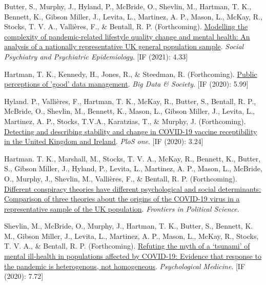 \documentclass[12pt]{article}
\begin{document}
\begin{bibenum}
\item Butter, S.,  Murphy, J., Hyland, P., McBride, O., Shevlin, M., Hartman, T. K., Bennett, K., Gibson Miller, J., Levita, L., Martinez, A. P., Mason, L., McKay, R., Stocks, T. V. A., Vallières, F., \& Bentall, R. P. (Forthcoming). \href{https://psyarxiv.com/2vw7d/}{Modelling the complexity of pandemic-related lifestyle quality change and mental health: An analysis of a nationally representative UK general population sample}. 
\emph{Social Psychiatry and Psychiatric Epidemiology}. [IF (2021): 4.33]

	\item Hartman, T. K., Kennedy, H., Jones, R., \& Steedman, R. (Forthcoming). 
		\href{https://doi.org/10.1177/2053951720935616}{Public perceptions of 'good' data management}.
	 	\emph{Big Data \& Society}. [IF (2020): 5.99]
		
	\item Hyland. P., Vallières, F., Hartman, T. K., McKay, R., 
	Butter, S., Bentall, R. P., McBride, O., Shevlin, M., Bennett, K., 
	Mason, L., Gibson Miller, J., Levita, L., Martinez, A. P.,
	Stocks, T.V.A., Karatzias, T., \& Murphy, J. (Forthcoming). 
	\href{}
	{Detecting and describing stability and change in COVID-19 vaccine receptibility in the United Kingdom and Ireland}. 
	\emph{PloS one}. [IF (2020): 3.24]

	\item Hartman. T. K., Marshall, M., Stocks, T. V. A., McKay, R.,  
	Bennett, K., Butter, S., Gibson Miller, J.,  Hyland, P., Levita, L., Martinez, A. P., 
	Mason, L., McBride, O., Murphy, J., Shevlin, M., Vallières, F., 
	\& Bentall, R. P.  (Forthcoming). 
		\href{https://doi.org/10.3389/fpos.2021.642510}{Different conspiracy theories have 
		different psychological and social determinants: Comparison of three 
		theories about the origins of the COVID-19 virus in a representative 
		sample of the UK population}.
		\emph{Frontiers in Political Science}.
	
	\item Shevlin, M.,  McBride, O., Murphy, J., Hartman, T. K., Butter, S., 
	Bennett, K. M., Gibson Miller, J., Levita, L., Martinez, A. P., Mason, L., 
	McKay, R., Stocks, T. V. A.,  \& Bentall, R. P. (Forthcoming). 
		\href{https://doi.org/10.1017/S0033291721001665}{Refuting the myth 
		of a ‘tsunami’ of mental ill-health in populations affected by 
		COVID-19: Evidence that response to the pandemic is heterogenous, 
		not homogeneous}.
		\emph{Psychological Medicine}. [IF (2020): 7.72]
		

\end{bibenum}
\end{document}
